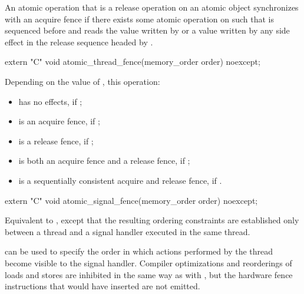 \pnum
An atomic operation  that is a release operation on an atomic object
 synchronizes with an acquire fence  if there exists some atomic
operation  on  such that  is sequenced before 
and reads the value written by  or a value written by any side effect in the
release sequence headed by .

%
\begin{itemdecl}
extern "C" void atomic_thread_fence(memory_order order) noexcept;
\end{itemdecl}

\begin{itemdescr}
\pnum
\effects Depending on the value of , this operation:

\begin{itemize}
\item has no effects, if ;

\item is an acquire fence, if ;

\item is a release fence, if ;

\item is both an acquire fence and a release fence, if ;

\item is a sequentially consistent acquire and release fence, if .
\end{itemize}
\end{itemdescr}

%
\begin{itemdecl}
extern "C" void atomic_signal_fence(memory_order order) noexcept;
\end{itemdecl}

\begin{itemdescr}
\pnum
\effects Equivalent to , except that
the resulting ordering constraints are established only between a thread and a
signal handler executed in the same thread.

\pnum
\begin{note}
 can be used to specify the order in which actions
performed by the thread become visible to the signal handler.
Compiler optimizations and reorderings of loads and stores are inhibited in
the same way as with , but the hardware fence instructions
that  would have inserted are not emitted.
\end{note}
\end{itemdescr}
